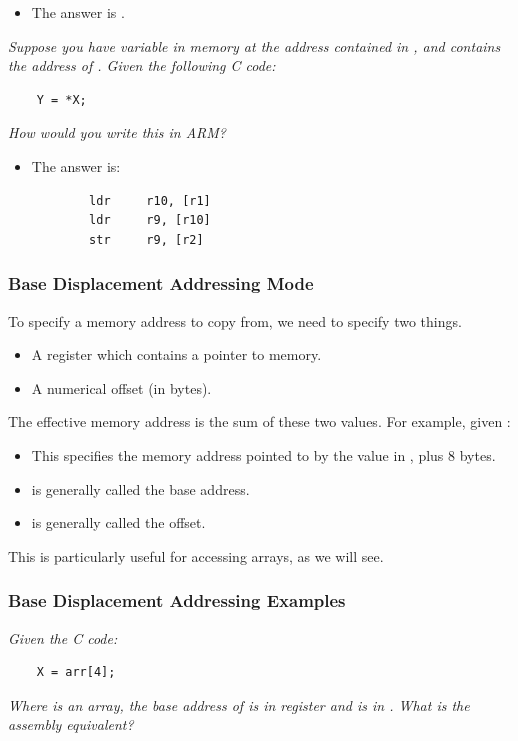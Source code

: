\documentclass[letterpaper]{article}
\begin{document}
\begin{itemize}
    \item The answer is . 
\end{itemize}

\bigskip 
\bigskip 

\emph{Suppose you have variable  in memory at the address contained in , and  contains the address of . Given the following C code:}
\begin{verbatim}
    Y = *X;
\end{verbatim}
\emph{How would you write this in ARM?}

\begin{itemize}
    \item The answer is: 
    \begin{verbatim}
        ldr     r10, [r1]
        ldr     r9, [r10]
        str     r9, [r2]
    \end{verbatim}
\end{itemize}

\subsubsection{Base Displacement Addressing Mode}
To specify a memory address to copy from, we need to specify two things.
\begin{itemize}
    \item A register which contains a pointer to memory. 
    \item A numerical offset (in bytes). 
\end{itemize}

The effective memory address is the sum of these two values. For example, given \code{[r0, \#8]}:
\begin{itemize}
    \item This specifies the memory address pointed to by the value in , plus 8 bytes.
    \item {} is generally called the base address. 
    \item {} is generally called the offset. 
\end{itemize}
This is particularly useful for accessing arrays, as we will see. 

\subsubsection{Base Displacement Addressing Examples}
\emph{Given the C code:}
\begin{verbatim}
    X = arr[4];
\end{verbatim}
\emph{Where  is an  array, the base address of  is in register  and  is in . What is the assembly equivalent?}
\end{document}
